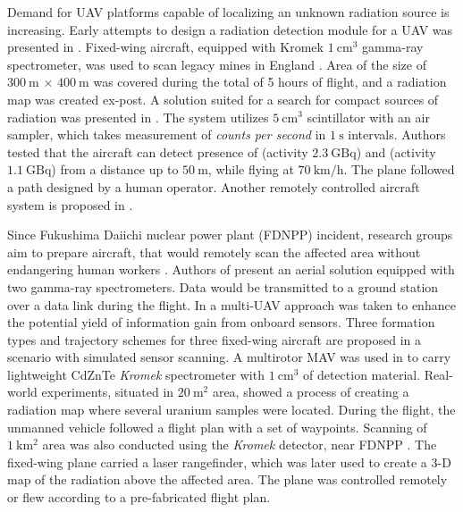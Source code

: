 \documentclass[a4paper,11pt,titlepage,twoside]{book}
\newcommand{\unit}[2]{$#1~\ensuremath{\mathrm{#2}}$}
\begin{document}
Demand for UAV platforms capable of localizing an unknown radiation source is increasing.
Early attempts to design a radiation detection module for a UAV was presented in \cite{kurvinen2005design}.
Fixed-wing aircraft, equipped with Kromek \unit{1}{cm^3} gamma-ray spectrometer, was used to scan legacy mines in England \cite{martin2015use}.
Area of the size of \unit{300}{m} $\times$ \unit{400}{m} was covered during the total of 5 hours of flight, and a radiation map was created ex-post.
A solution suited for a search for compact sources of radiation was presented in \cite{pollanen2009radiation, pollanen2009performance}.
The system utilizes \unit{5}{cm^3} scintillator with an air sampler, which takes measurement of \textit{counts per second} in \unit{1}{s} intervals.
Authors tested that the aircraft can detect presence of  (activity \unit{2.3}{GBq}) and  (activity \unit{1.1}{GBq}) from a distance up to \unit{50}{m}, while flying at \unit{70}{km/h}.
The plane followed a path designed by a human operator.
Another remotely controlled aircraft system is proposed in \cite{aleotti2015unmanned}.

Since Fukushima Daiichi nuclear power plant (FDNPP) incident, research groups aim to prepare aircraft, that would remotely scan the affected area without endangering human workers \cite{macfarlane2014lightweight, martin20163d, martin2015use, sanada2015aerial, tang2016efficiency, towler2012radiation, han2013lowcost}.
Authors of \cite{tang2016efficiency} present an aerial solution equipped with two gamma-ray spectrometers.
Data would be transmitted to a ground station over a data link during the flight.
In \cite{han2013lowcost} a multi-UAV approach was taken to enhance the potential yield of information gain from onboard sensors.
Three formation types and trajectory schemes for three fixed-wing aircraft are proposed in a scenario with simulated sensor scanning.
A multirotor MAV was used in \cite{macfarlane2014lightweight} to carry lightweight CdZnTe \textit{Kromek} spectrometer with \unit{1}{cm^3} of detection material.
Real-world experiments, situated in \unit{20}{m^2} area, showed a process of creating a radiation map where several uranium samples were located.
During the flight, the unmanned vehicle followed a flight plan with a set of waypoints.
Scanning of \unit{1}{km^2} area was also conducted using the \textit{Kromek} detector, near FDNPP \cite{martin20163d, martin2015use}.
The fixed-wing plane carried a laser rangefinder, which was later used to create a 3-D map of the radiation above the affected area.
The plane was controlled remotely or flew according to a pre-fabricated flight plan.
\end{document}
